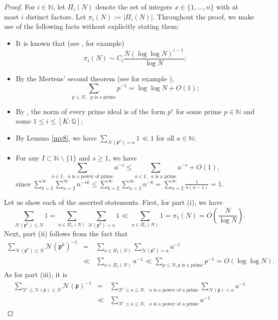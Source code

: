 \documentclass[11pt]{amsart}
\theoremstyle{definition}
\newcommand{\N}{{\mathbb N}}
\newcommand{\NN}{{\mathcal N}}
\newcommand{\Q}{{\mathbb Q}}
\newcommand{\mf}{\mathfrak}
\begin{document}
\begin{proof}
For $i\in\N$, let  $\Pi_{i}(N)$ denote the set of integers  $x\in\{1,\dots,n\}$ with at most $i$ distinct factors. Let $\pi_{i}(N):=\vert\Pi_{i}(N)\vert$. 
Throughout the proof, we make use of the following facts without explicitly stating them:
\begin{itemize}
    \item It is known that (see \cite[Chapter II.6]{tenebaum_2015}, for example)
$$\pi_{i}(N)\sim C_{i}\frac{N(\log\log N)^{i-1}}{\log N};$$
\item By the Mertens' second theorem (see for example \cite[Chapter I.1, Theorem~9]{tenebaum_2015}), 
$$\sum_{p\leq N, \text{ $p$ is a prime}} p^{-1}=\log\log N+O(1);$$
\item By \cite[Lemma~2.9]{S23}, the norm of every prime ideal is of the form $p^{r}$ for some prime $p\in\N$ and some $1\leq i\leq [K:\Q]$;
\item By Lemma \ref{mv8}, we have 
$\sum_{\NN(\mf p^{k})=a} 1\ll 1$ for all $a\in\N$;
\item For any $I\subset\N\backslash\{1\}$ and $s\geq 1$, we have $$\sum_{a\in I, \text{ $a$ is a power of prime}}a^{-s}\leq \sum_{a\in I, \text{ $a$ is a prime}}a^{-s}+O(1),$$
since $\sum_{k=2}^{\infty}\sum_{n=2}^{\infty}n^{-sk}\leq \sum_{k=2}^{\infty}\sum_{n=2}^{\infty}n^{-k}=\sum_{n=2}^{\infty}\frac{1}{n(n-1)}=1.$
\end{itemize}
Let us show each of the asserted statements. 
First, for part (i), we have
$$\sum_{\NN(\mf p^{k})\leq N} 1=\sum_{a\in \Pi_{1}(N)}\sum_{\NN(\mf p^{k})=a} 1\ll \sum_{a\in \Pi_{1}(N)} 1=\pi_{1}(N)=O\left(\frac{N}{\log N}\right).$$
Next, part (ii) follows from the fact that
\begin{eqnarray*}
    \sum_{\NN(\mf p^{k})\leq N} \NN(\mf p^{k})^{-1} & = & \sum_{a\in \Pi_{1}(N)}\sum_{\NN(\mf p^{k})=a} a^{-1}
      \\&\ll & \sum_{a\in \Pi_{1}(N)} a^{-1}\ll \sum_{p\leq N, p \text{ is a prime}} p^{-1}=O(\log\log N).
\end{eqnarray*}
\iffalse
As for part (iii), it is 
\begin{eqnarray*}
    \sum_{N^{\varepsilon}\leq \NN(\mf p)\leq N}\NN(\mf p)^{-1}
 & = & \sum_{N^{\varepsilon}\leq a\leq N, \text{ $a$ is a power of a prime}} \sum_{\NN(\mf p)=a} a^{-1}
 \\ &\ll & \sum_{N^{\varepsilon}\leq a\leq N, \text{ $a$ is a power of a prime}}a^{-1}

\end{eqnarray*}
\end{proof}
\end{document}
